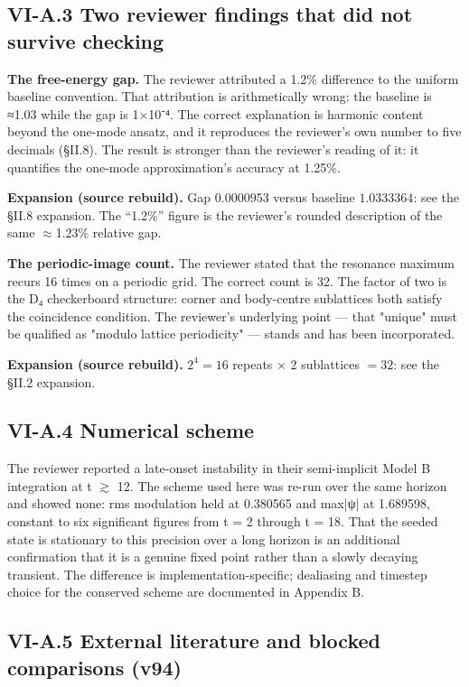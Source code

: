 \documentclass[a4paper,11pt]{article}
\newcommand{\expansion}[1]{\par\smallskip\noindent\textbf{Expansion (source rebuild).} #1\par\smallskip}
\begin{document}
\subsection*{VI-A.3 Two reviewer findings that did not survive checking}

\textbf{The free-energy gap.} The reviewer attributed a 1.2\% difference to the uniform baseline convention. That attribution is arithmetically wrong: the baseline is ≈1.03 while the gap is 1×10⁻⁴. The correct explanation is harmonic content beyond the one-mode ansatz, and it reproduces the reviewer's own number to five decimals (§II.8). The result is stronger than the reviewer's reading of it: it quantifies the one-mode approximation's accuracy at 1.25\%.


\expansion{Gap $0.0000953$ versus baseline $1.0333364$: see the \S II.8 expansion. The ``1.2\%'' figure is the reviewer's rounded description of the same $\approx$1.23\% relative gap.}
\textbf{The periodic-image count.} The reviewer stated that the resonance maximum recurs 16 times on a periodic grid. The correct count is 32. The factor of two is the D₄ checkerboard structure: corner and body-centre sublattices both satisfy the coincidence condition. The reviewer's underlying point — that "unique" must be qualified as "modulo lattice periodicity" — stands and has been incorporated.


\expansion{$2^4 = 16$ repeats $\times$ 2 sublattices $= 32$: see the \S II.2 expansion.}
\subsection*{VI-A.4 Numerical scheme}

The reviewer reported a late-onset instability in their semi-implicit Model B integration at t $\gtrsim$ 12. The scheme used here was re-run over the same horizon and showed none: rms modulation held at 0.380565 and max|ψ| at 1.689598, constant to six significant figures from t = 2 through t = 18. That the seeded state is stationary to this precision over a long horizon is an additional confirmation that it is a genuine fixed point rather than a slowly decaying transient. The difference is implementation-specific; dealiasing and timestep choice for the conserved scheme are documented in Appendix B.

\subsection*{VI-A.5 External literature and blocked comparisons (v94)}
\end{document}
